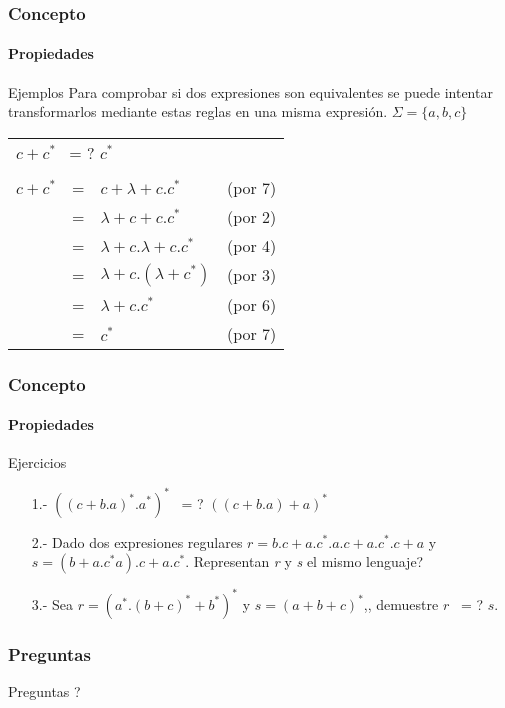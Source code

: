 \documentclass{beamer}
\begin{document}
        \begin{frame}
			\frametitle{Concepto}
			\framesubtitle{Propiedades}

			\begin{exampleblock}{Ejemplos}
			    Para comprobar si dos expresiones son equivalentes se puede intentar transformarlos mediante estas reglas en una misma expresi\'on. $\Sigma=\{a,b,c\}$ 
			    \begin{table}[H]
			                \begin{tabular}{rcll}
			                   \multicolumn{4}{l}{$c+c^{*}$ \textquestiondown~= ? $c^{*}$} \\ 
			                   & & & \\
			                    $c + c^{*}$
			                    & = & $c + \lambda + c.c^{*}$ & (por 7) \\
			                    & = & $\lambda + c + c.c^{*}$ & (por 2) \\
                               & = & $\lambda + c.\lambda + c.c^{*}$ & (por 4) \\
                               & = & $\lambda + c.(\lambda + c^{*})$ & (por 3) \\
                               & = & $\lambda + c.c^{*}$ & (por 6) \\
                               & = & $c^{*}$ & (por 7) \\
			                \end{tabular}
			        \end{table}
			\end{exampleblock}
		\end{frame}

        \begin{frame}
			\frametitle{Concepto}
			\framesubtitle{Propiedades}

			\begin{exampleblock}{Ejercicios}
			    \begin{itemize}
			        \item[1.-] $((c + b.a)^{*}.a^{*})^{*}$ \textquestiondown~= ? $((c + b.a) + a)^{*}$
			        \item[2.-] Dado dos expresiones regulares $r = b.c+a.c^{*}.a.c+a.c^{*}.c+a$ y $s=(b + a.c^{*}a).c+a.c^{*}$. \textquestiondown Representan \emph{r} y \emph{s} el mismo lenguaje?
			        \item[3.-] Sea $r = (a^{*}.(b + c)^{*}+b^{*})^{*}$ y $s = (a + b + c)^{*}$,, demuestre $r$ \textquestiondown~= ? $s$.
			    \end{itemize}
			\end{exampleblock}
		\end{frame}

		\begin{frame}
			\frametitle{Preguntas}

			\hspace{4cm}\huge{Preguntas ?}
		
		\end{frame}
	
\end{document}

